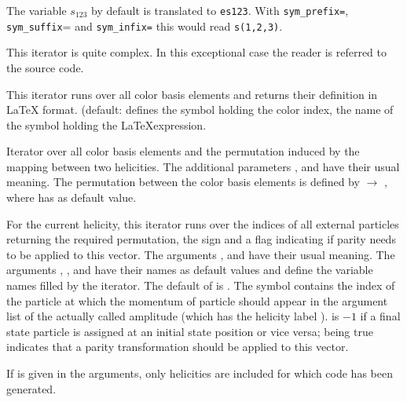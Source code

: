 \documentclass[11pt,a4paper]{refrep}
\begin{document}
\begin{description}
The variable $s_{123}$ by default is translated to \texttt{es123}. With
\texttt{sym\_prefix=}, \texttt{sym\_suffix}=\lit{)} and
\texttt{sym\_infix=}\lit{,} this would read \texttt{s(1,2,3)}.
\item[\texttt{mandelstam\_expression}]
   This iterator is quite complex. In this exceptional case the reader
   is referred to the source code.
\item[\texttt{latex\_color\_base}
   {[\texttt{var=}\synt{var}]}
   {[\texttt{expr=}\synt{expression}]}]
   This iterator runs over all color basis elements and returns their
   definition in \LaTeX{} format.  (default: \lit{\$\_}
   defines the symbol holding
   the color index,  the name of the symbol holding
   the \LaTeX expression.
\item[\texttt{color\_mapping}
   {[\texttt{index=}\synt{index}]}
   {[\texttt{var=}\synt{var}]}] Iterator over all color basis elements
   and the permutation induced by the mapping between two helicities.
   The additional parameters ,  and 
   have their usual meaning. The permutation between the color basis
   elements is defined by  $\to$ , where 
   has \lit{\$\_} as default value.
\item[\texttt{helicity\_mapping}
  {[\texttt{index=}\synt{index}]}
  {[\texttt{var=}\synt{var}]}
  {[\texttt{sign=}\synt{sign}]}
  {[\texttt{parity=}\synt{parity}]}
  {[\texttt{shift=}\synt{shift}]}]
   For the current helicity, this iterator
   runs over the indices of all external particles returning the required
   permutation, the sign and a flag indicating if parity needs to be applied
   to this vector. The arguments ,  and 
   have their usual meaning. The arguments , ,
   and  have their names as default values and
   define the variable names filled by the iterator. The default of 
   is \lit{\$\_}.
   The symbol  contains the index of the particle at
   which the momentum of particle  should appear in the
   argument list of the actually called amplitude (which has the helicity
   label ).  is $-1$ if a final state particle is
   assigned at an initial state position or vice versa;  being
   true indicates that a parity transformation should be applied to this
   vector.
\item[\texttt{helicities} {[\texttt{generated}]}]
   If  is given in the arguments, only helicities
   are included for which code has been generated.


\end{description}
\end{document}
